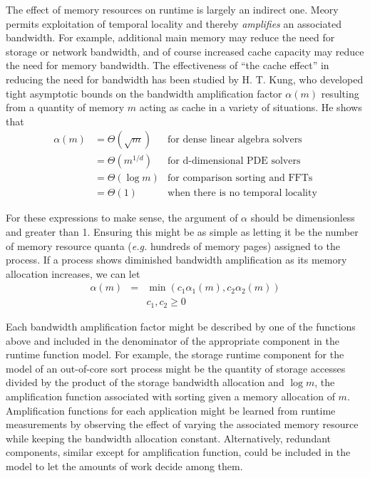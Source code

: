 The effect of memory resources on runtime is largely an indirect one.
Meory permits exploitation of temporal locality and thereby \emph{amplifies} an associated bandwidth.
For example, additional main memory may reduce the need for storage or network bandwidth,
and of course increased cache capacity may reduce the need for memory bandwidth.
The effectiveness of ``the cache effect'' in reducing the need for bandwidth has been studied by
H. T. Kung\cite{Ku}, who developed tight asymptotic bounds on the bandwidth amplification
factor $\alpha(m)$ resulting from a quantity of memory $m$ acting as cache in a variety of situations.
He shows that
\begin{displaymath}
\begin{array}{lll}
\alpha(m) &= \Theta(\sqrt m) & \mbox{for dense linear algebra solvers} \\
          &= \Theta(m^{1/d}) & \mbox{for d-dimensional PDE solvers} \\
          &= \Theta(\log m)  & \mbox{for comparison sorting and FFTs} \\
          &= \Theta(1)       & \mbox{when there is no temporal locality}
\end{array}
\end{displaymath}

For these expressions to make sense, the argument of $\alpha$ should be dimensionless and greater than 1.
Ensuring this might be as simple as letting it be the number of memory resource quanta
(\emph{e.g.} hundreds of memory pages) assigned to the process.
If a process shows diminished bandwidth amplification as its memory allocation increases, we can let
\begin{eqnarray*}
\alpha(m) &=& \min(c_1\alpha_1(m),c_2\alpha_2(m)) \\
          & &c_1,c_2 \geq 0
\end{eqnarray*}

Each bandwidth amplification factor might be described by one of the functions above
and included in the denominator of the appropriate component in the runtime function model.
For example, the storage runtime component for the model of an out-of-core sort process might be
the quantity of storage accesses divided by the product of the storage bandwidth allocation and $\log m$,
the amplification function associated with sorting given a memory allocation of $m$.
Amplification functions for each application might be learned from runtime measurements
by observing the effect of varying the associated memory resource while keeping the bandwidth allocation constant.
Alternatively, redundant components, similar except for amplification function, could be included in the model
to let the amounts of work decide among them.


